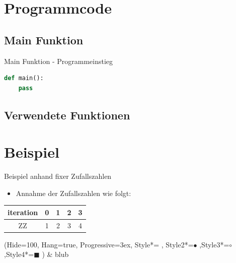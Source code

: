 \section{Programmcode}
\subsection{Main Funktion}
\begin{frame}[fragile]{Main Funktion - Programmeinstieg}
  \begin{lstlisting}[language=python]
def main():
	pass
\end{lstlisting}
\logopythonbottom
\end{frame}

\subsection{Verwendete Funktionen}
%
%


\section{Beispiel}
\begin{frame}[fragile]{Beispiel anhand fixer Zufallszahlen}
\begin{itemize}
\item Annahme der Zufallszahlen wie folgt:
\end{itemize}
\begin{center}
  \begin{tabular}{c|c|c|c|c}
  \hline 
  iteration & 0 & 1 & 2 & 3\\ 
  \hline 
  ZZ      & 1 & 2 & 3 & 4 \\ 
  \end{tabular} 
\end{center}
\begin{easylist}
\ListProperties(Hide=100, Hang=true, Progressive=3ex, Style*= ,
Style2*=$\bullet$ ,Style3*=$\circ$ ,Style4*=\tiny$\blacksquare$ )
& blub
\end{easylist}
\end{frame}


